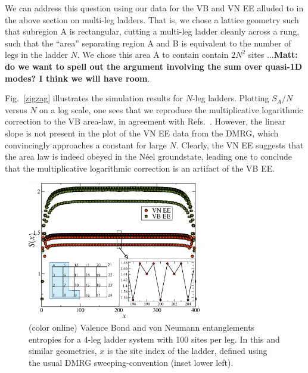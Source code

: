 \documentclass[prl,aps,twocolumn,floatfix,amsmath,amssymb,superscriptaddress,tightenlines]{revtex4}
\begin{document}
We can address this question using our data for the VB and VN EE alluded
to in the above section on multi-leg ladders.  That is, we chose a lattice
geometry such that subregion A is rectangular, cutting a multi-leg ladder
cleanly across a rung, such that the ``area'' separating region A and B is
equivalent to the number of legs in the ladder $N$.  We chose this area A
to contain contain $2N^2$ sites ...{\bf Matt: do we want to spell out the
argument involving the sum over quasi-1D modes?  I think we will have
room}.

Fig.~\ref{zigzag} illustrates the simulation results for $N$-leg ladders.
Plotting $S_A/N$ versus $N$ on a log scale, one sees that we reproduce the
multiplicative logarithmic correction to the VB area-law, in agreement
with Refs.~\cite{Alet,Chh}.  However, the linear slope is not present in
the plot of the VN EE data from the DMRG, which convincingly approaches a
constant for large $N$.  Clearly, the VN EE suggests that the area law is
indeed obeyed in the N\'eel groundstate, leading one to conclude that the
multiplicative logarithmic correction is an artifact of the VB EE.


\begin{figure} { \includegraphics[width=3in]{FIG2.eps} \caption{(color
online) Valence Bond and von Neumann entanglements entropies for a 4-leg
ladder system with 100 sites per leg.  In this and similar geometries, $x$
is the site index of the ladder, defined using the usual DMRG
sweeping-convention (inset lower left).  \label{ladder}}} \end{figure}
\end{document}
